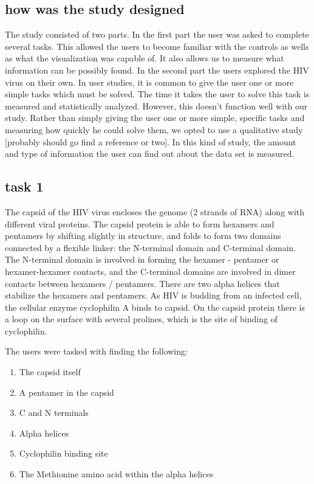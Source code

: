 \documentclass[review,journal]{vgtc}         %
\begin{document}
\subsection{how was the study designed}
The study consisted of two parts. In the first part the user was asked to complete several tasks. This allowed the users to become familiar with the controls as wells as what the visualization was capable of. It also allows us to measure what information can be possibly found.  In the second part the users explored the HIV virus on their own. 
In user studies, it is common to give the user one or more simple tasks which must be solved. The time it takes the user to solve this task is measured and statistically analyzed. However, this doesn't function well with our study. 
Rather than simply giving the user one or more simple, specific tasks and measuring how quickly he could solve them, we opted to use a qualitative study [probably should go find a reference or two]. In this kind of study, the amount and type of information the user can find out about the data set is measured. 


\subsection{task 1}
The capsid of the HIV virus encloses the genome (2 strands of RNA) along with different viral proteins. The capsid protein is able to form hexamers and pentamers by shifting slightly in structure, and folds to form two domains connected by a flexible linker: the N-terminal domain and C-terminal domain. The N-terminal domain is involved in forming the hexamer - pentamer or hexamer-hexamer contacts, and the C-terminal domains are involved in dimer contacts between hexamers / pentamers. There are two alpha helices that stabilize the hexamers and pentamers. As HIV is budding from an infected cell, the cellular enzyme cyclophilin A binds to capsid. On the capsid protein there is a loop on the surface with several prolines, which is the site of binding of cyclophilin. 

The users were tasked with finding the following:

\begin{enumerate}
	\item The capsid itself
	\item A pentamer in the capsid
	\item C and N terminals
	\item Alpha helices
	\item Cyclophilin binding site
	\item The Methionine amino acid within the alpha helices 
\end{enumerate}
\end{document}
